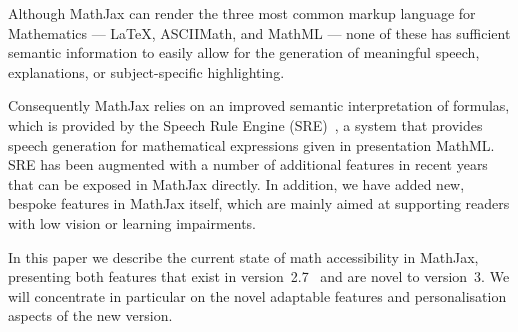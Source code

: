 \documentclass{sig-alternate}
\begin{document}
Although MathJax can render the three most common markup language for
Mathematics --- {\LaTeX}, ASCIIMath, and MathML --- none of these has sufficient
semantic information to easily allow for the generation of meaningful speech,
explanations, or subject-specific highlighting.

Consequently MathJax relies on an improved semantic interpretation of formulas, which
is provided by the Speech Rule Engine (SRE)~\cite{}, a system that provides
speech generation for mathematical expressions given in presentation MathML.
SRE has been augmented with a number of additional features in recent years
that can be exposed in MathJax directly.  In addition, we have added new,
bespoke features in MathJax itself, which are mainly aimed at supporting readers
with low vision or learning impairments.

In this paper we describe the current state of math accessibility in MathJax,
presenting both features that exist in version~2.7~\cite{cervone2016towards} and
are novel to version~3. We will concentrate in particular on the novel adaptable
features and personalisation aspects of the new version.
\end{document}
